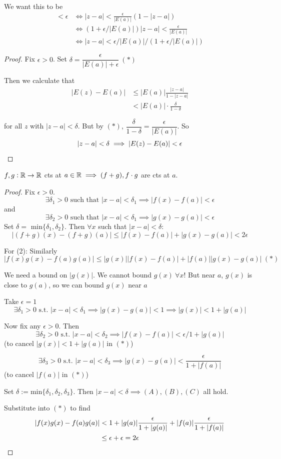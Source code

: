 \documentclass[10pt,twoside]{scrartcl}
\begin{document}
We want this to be
\begin{align*}
 < \epsilon &\iff |z-a| < \frac{\epsilon}{|E(a)|}(1-|z-a|)\\
&\iff (1 + \epsilon/|E(a)|)|z-a| < \frac{\epsilon}{|E(a)|}\\
&\iff |z-a| < \epsilon/|E(a)|/(1 + \epsilon/|E(a)|)
\end{align*}



\begin{proof}
Fix $\epsilon >0$. Set $\delta = \dfrac{\epsilon}{|E(a)| + \epsilon} ~(*)$

Then we calculate that 
\begin{align*}
|E(z) - E(a)| &\leq |E(a)| \frac{|z-a|}{1-|z-a|} \\
&< |E(a)| \cdot \frac{\delta}{1-\delta}	
\end{align*}

for all $z$ with $|z-a| < \delta$. But by $(*)$, $\dfrac{\delta}{1-\delta} = \dfrac{\epsilon}{|E(a)|}$. So \[|z-a|< \delta \implies |E(z) - E(a)| < \epsilon\qedhere\]
\end{proof}\vsp


\begin{theorem}
$f,g: \mathbb{R} \to \mathbb{R}$ cts at $a \in \mathbb{R} \implies (f + g), f\cdot g$ are cts at $a$.
\end{theorem}
\begin{proof}
	Fix $\epsilon >0.$ \[\exists \delta_1 >0 \text{ such that }|x-a| < \delta_1 \implies |f(x) - f(a)| < \epsilon\] and\[\exists \delta_2 >0 \text{ such that }|x-a| < \delta_1 \implies |g(x) - g(a)| < \epsilon\]
	 Set $\delta =$ min$\{\delta_1,\delta_2\}.$ Then $\forall x$ such that $|x-a| < \delta:$
	\[|(f+g)(x) - (f+g)(a)| \leq |f(x) - f(a)| + |g(x) - g(a)| < 2\epsilon\]
	
	For (2): Similarly
	\[|f(x)g(x) - f(a)g(a)| \leq |g(x)||f(x) - f(a)| + |f(a)||g(x) - g(a)| ~(*)\]
	
	We need a bound on $|g(x)|$. We cannot bound $g(x)~ \forall x$!  But near $a$, $g(x)$ is close to $g(a)$, so we can bound $g(x)$ near $a$
	
	Take $\epsilon =1$ 
	\[\exists \delta_1 > 0\text{ s.t. }|x-a| < \delta_1 \implies |g(x) - g(a)| < 1 \implies |g(x)| < 1 + |g(a)| \tag{A}\]
	
	Now fix any $\epsilon >0$. Then 
	\[\exists \delta_2 > 0\text{ s.t. }|x-a| < \delta_2 \implies |f(x) - f(a)| < \epsilon/1+|g(a)| \tag{B}\] (to cancel $|g(x)| < 1+|g(a)|$ in $(*)$)
	
	\[\exists \delta_3 > 0 \text{ s.t. } |x-a| < \delta_3 \implies |g(x) - g(a)| < \frac{\epsilon}{1 + |f(a)|} \tag{C}\]
	(to cancel $|f(a)|$ in $(*)$)
	
	Set $\delta := \mathrm{min}\{\delta_1,\delta_2,\delta_3\}$. Then $|x-a| < \delta \implies (A), (B), (C)$ all hold. 
	
	Substitute into $(*)$ to find 
	\begin{align*}|f(x)g(x) - f(a)g(a)| &< 1+|g(a)|\frac{\epsilon}{1+|g(a)|} + |f(a)|\frac{\epsilon}{1 + |f(a)|}\\
	&\leq \epsilon + \epsilon = 2\epsilon \qedhere
\end{align*}
\end{proof}
\end{document}
